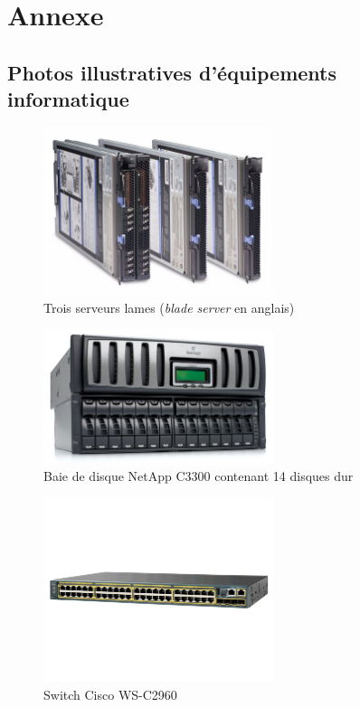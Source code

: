\part{Annexe}

\chapter{Photos illustratives d'équipements informatique}

\begin{figure}[H]
	\centering
	\includegraphics[width=0.6\textwidth]{resource/img/blade}
	\caption{Trois serveurs lames (\emph{blade server} en anglais)}
\end{figure}

\begin{figure}[H]
	\centering
	\includegraphics[width=0.6\textwidth]{resource/img/netapp_c3300}
	\caption{Baie de disque NetApp C3300 contenant 14 disques dur}
	\label{netapp}
\end{figure}

\begin{figure}[H]
	\centering
	\includegraphics[width=0.6\textwidth]{resource/img/cisco-switch}
	\caption{Switch Cisco WS-C2960}
\end{figure}

